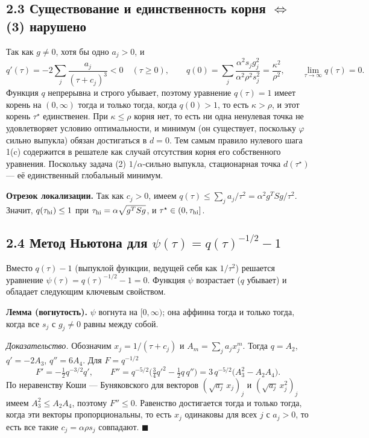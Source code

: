 \documentclass[11pt,a4paper]{article}
\begin{document}
\subsection*{2.3 Существование и единственность корня $\Longleftrightarrow$ (3) нарушено}

Так как $g\ne0$, хотя бы одно $a_j>0$, и
\begin{equation*}
q'(\tau)=-2\sum_j\frac{a_j}{(\tau+c_j)^3}<0\quad(\tau\ge0),\qquad
q(0)=\sum_j\frac{\alpha^2s_jg_j^2}{\alpha^2\rho^2s_j^2}=\frac{\kappa^2}{\rho^2},\qquad
\lim_{\tau\to\infty}q(\tau)=0 .
\end{equation*}
Функция $q$ непрерывна и строго убывает, поэтому уравнение $q(\tau)=1$ имеет корень на
$(0,\infty)$ тогда и только тогда, когда $q(0)>1$, то есть $\kappa>\rho$, и этот корень
$\tau^\star$ единственен. При $\kappa\le\rho$ корня нет, то есть ни одна ненулевая
точка не удовлетворяет условию оптимальности, и минимум (он существует, поскольку
$\varphi$ сильно выпукла) обязан достигаться в $d=0$. Тем самым правило нулевого шага
1(c) содержится в решателе как случай отсутствия корня его собственного уравнения.
Поскольку задача (2) $1/\alpha$-сильно выпукла, стационарная точка $d(\tau^\star)$ —
её единственный глобальный минимум.

\textbf{Отрезок локализации.} Так как $c_j>0$, имеем
$q(\tau)\le\sum_ja_j/\tau^2=\alpha^2g^TSg/\tau^2$. Значит, $q(\tau_{\rm hi})\le1$ при
$\tau_{\rm hi}=\alpha\sqrt{g^TSg}$, и $\tau^\star\in(0,\tau_{\rm hi}]$.

\subsection*{2.4 Метод Ньютона для $\psi(\tau)=q(\tau)^{-1/2}-1$}

Вместо $q(\tau)-1$ (выпуклой функции, ведущей себя как $1/\tau^2$) решается уравнение
$\psi(\tau)=q(\tau)^{-1/2}-1=0$. Функция $\psi$ возрастает ($q$ убывает) и обладает
следующим ключевым свойством.

\textbf{Лемма (вогнутость).} $\psi$ вогнута на $[0,\infty)$; она аффинна тогда и
только тогда, когда все $s_j$ с $g_j\ne0$ равны между собой.

\emph{Доказательство.} Обозначим $x_j=1/(\tau+c_j)$ и $A_m=\sum_ja_jx_j^m$. Тогда
$q=A_2$, $q'=-2A_3$, $q''=6A_4$. Для $F=q^{-1/2}$
\begin{equation*}
F'=-\tfrac12q^{-3/2}q',\qquad
F''=q^{-5/2}\Big(\tfrac34q'^2-\tfrac12q\,q''\Big)=3\,q^{-5/2}\big(A_3^2-A_2A_4\big).
\end{equation*}
По неравенству Коши — Буняковского для векторов $(\sqrt{a_j}\,x_j)_j$ и
$(\sqrt{a_j}\,x_j^2)_j$ имеем $A_3^2\le A_2A_4$, поэтому $F''\le0$. Равенство
достигается тогда и только тогда, когда эти векторы пропорциональны, то есть $x_j$
одинаковы для всех $j$ с $a_j>0$, то есть все такие $c_j=\alpha\rho s_j$ совпадают.
\hfill$\blacksquare$
\end{document}
